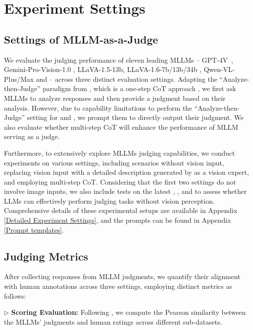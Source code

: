 \section{Experiment Settings}
\subsection{Settings of MLLM-as-a-Judge}
We evaluate the judging performance of eleven leading MLLMs – GPT-4V~\citep{openai2023gpt4v}, Gemini-Pro-Vision-1.0 \citep{geminiteam2023gemini}, LLaVA-1.5-13b, LLaVA-1.6-7b/13b/34b \citep{liu2023llava},  Qwen-VL-Plus/Max \citep{Qwen-VL} and  \citep{wang2023cogvlm} – across three distinct evaluation settings. Adapting the ``Analyze-then-Judge'' paradigm from \citet{chiang2023closer}, which is a one-step CoT approach \citep{wei2022chain}, we first ask MLLMs to analyze responses and then provide a judgment based on their analysis. However, due to capability limitations to perform the ``Analyze-then-Judge'' setting for  and , we prompt them to directly output their judgment. We also evaluate whether multi-step CoT will enhance the performance of MLLM serving as a judge.

Furthermore, to extensively explore MLLMs judging capabilities, we conduct experiments on various settings, including scenarios without vision input, replacing vision input with a detailed description generated by  as a vision expert, and employing multi-step CoT. 
Considering that the first two settings do not involve image inputs, we also include tests on the latest  \citep{openai2023gpt4}  \citep{geminiteam2023gemini},  \citep{touvron2023llama}, and  \citep{jiang2024mixtral} to assess whether LLMs can effectively perform judging tasks without vision perception. Comprehensive details of these experimental setups are available in Appendix \ref{Detailed Experiment Settings}, and the prompts can be found in Appendix \ref{Prompt templates}.

\subsection{Judging Metrics}
After collecting responses from MLLM judgments, we quantify their alignment with human annotations across three settings, employing distinct metrics as follows:

    $\triangleright$ \textbf{Scoring Evaluation:} Following  \citep{zheng2023judging}, we compute the Pearson similarity \citep{lee1988thirteen} between the MLLMs' judgments and human ratings across different sub-datasets.
    
